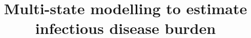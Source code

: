 \documentclass[a4paper,12pt,times,custombib,oneside]{PhDThesisPSnPDF}
\title{Multi-state modelling to estimate infectious disease burden}
\begin{document}
\mainmatter

\maketitle









\tableofcontents
\clearpage
\listoffigures
\clearpage
\listoftables

\begin{spacing}{0.9}
\printnomenclature
\end{spacing}









\begin{spacing}{0.9}

\cleardoublepage
\printbibliography[title=References, heading=bibintoc]

\end{spacing}


\begin{appendices}







\end{appendices}
\end{document}
